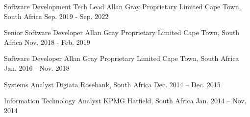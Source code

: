 

\begin{cventries}

  \cventry
    {Software Development Tech Lead} %
    {Allan Gray Proprietary Limited} %
    {Cape Town, South Africa} %
    {Sep. 2019 - Sep. 2022} %
    {}

  \cventry
    {Senior Software Developer} %
    {Allan Gray Proprietary Limited} %
    {Cape Town, South Africa} %
    {Nov. 2018 - Feb. 2019} %
    {}

  \cventry
    {Software Developer} %
    {Allan Gray Proprietary Limited} %
    {Cape Town, South Africa} %
    {Jan. 2016 - Nov. 2018} %
    {}

  \cventry
    {Systems Analyst} %
    {Digiata} %
    {Rosebank, South Africa} %
    {Dec. 2014 – Dec. 2015}%
    {}
    
  \cventry
    {Information Technology Analyst} %
    {KPMG} %
    {Hatfield, South Africa} %
    {Jan. 2014 – Nov. 2014} %
    {}
\end{cventries}

